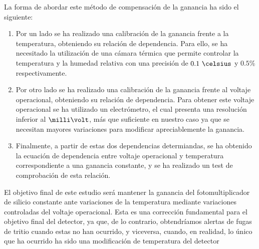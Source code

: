La forma de abordar este método de compensación de la ganancia ha sido el siguiente:
\begin{enumerate}
\item {} 
Por un lado se ha realizado una calibración de la ganancia frente a la temperatura, obteniendo su relación de dependencia. Para ello, se ha necesitado la utilización de una cámara térmica que permite controlar la temperatura y la humedad relativa con una precisión de $0.1~\celsius$   y  $0.5$\% respectivamente.

\item {} Por otro lado se ha realizado una calibración de la ganancia frente al voltaje operacional, obteniendo su relación de dependencia. Para obtener este voltaje operacional se ha utilizado un electrómetro, el cual presenta una resolución inferior al $\milli\volt$, más que suficiente en nuestro caso ya que se necesitan mayores variaciones para modificar apreciablemente  la ganancia.

\item {} Finalmente, a partir de estas dos dependencias determiandas, se ha obtenido la ecuación de dependencia entre voltaje operacional y temperatura correspondiente a una ganancia constante,  y se ha realizado un test de comprobación de esta relación.
\end{enumerate}

El objetivo final de este estudio será mantener la ganancia del fotomultiplicador de silicio constante ante variaciones de la temperatura mediante variaciones controladas del voltaje operacional. Esta es una corrección fundamental para el objetivo final del detector, ya que, de lo contrario, obtendríamos alertas de fugas de tritio cuando estas no han ocurrido, y viceversa,  cuando, en realidad, lo único que ha ocurrido ha sido una modificación de temperatura del detector